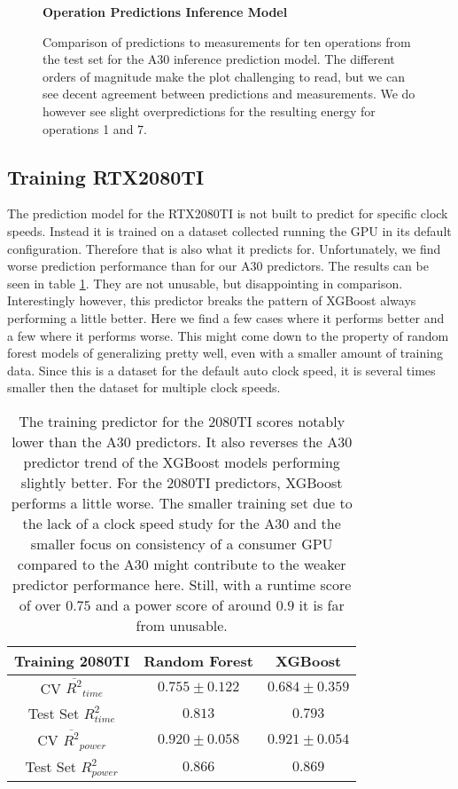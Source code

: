 \begin{figure}[htbp]
    \centering
    \parbox{1.1\textwidth}{\centering\textbf{Operation Predictions Inference Model}}
    \caption{Comparison of predictions to measurements for ten operations from the test set for the A30 inference prediction model. The different orders of magnitude make the plot challenging to read, but we can see decent agreement between predictions and measurements. We do however see slight overpredictions for the resulting energy for operations 1 and 7.}
    \label{fig:testsetops_inf}
\end{figure}


\subsection{Training RTX2080TI}

The prediction model for the RTX2080TI is not built to predict for specific clock speeds. Instead it is trained on a dataset collected running the GPU in its default configuration. Therefore that is also what it predicts for. Unfortunately, we find worse prediction performance than for our A30 predictors. The results can be seen in table \ref{tab:pred_res_2080}. They are not unusable, but disappointing in comparison. Interestingly however, this predictor breaks the pattern of XGBoost always performing a little better. Here we find a few cases where it performs better and a few where it performs worse. This might come down to the property of random forest models of generalizing pretty well, even with a smaller amount of training data. Since this is a dataset for the default auto clock speed, it is several times smaller then the dataset for multiple clock speeds. 

\begin{table}[h!]
\centering
\begin{tabular}{|c|c|c|}
\hline
 \textbf{Training 2080TI}& \textbf{Random Forest} & \textbf{XGBoost} \\
\hline
CV $\overline{R^2}_{time}$ & $0.755 \pm 0.122$ &  $0.684 \pm 0.359$ \\
\hline
Test Set $R^2_{time}$ & $0.813$ & $0.793$ \\
\hline
CV $\overline{R^2}_{power}$ & $0.920 \pm 0.058$  &  $0.921 \pm 0.054$\\
\hline
Test Set $R^2_{power}$ & $0.866$ & $0.869$ \\
\hline
\end{tabular}
\caption{The training predictor for the 2080TI scores notably lower than the A30 predictors. It also reverses the A30 predictor trend of the XGBoost models performing slightly better. For the 2080TI predictors, XGBoost performs a little worse. The smaller training set due to the lack of a clock speed study for the A30 and the smaller focus on consistency of a consumer GPU compared to the A30 might contribute to the weaker predictor performance here. Still, with a runtime score of over $0.75$ and a power score of around $0.9$ it is far from unusable.}
\label{tab:pred_res_2080}
\end{table}

